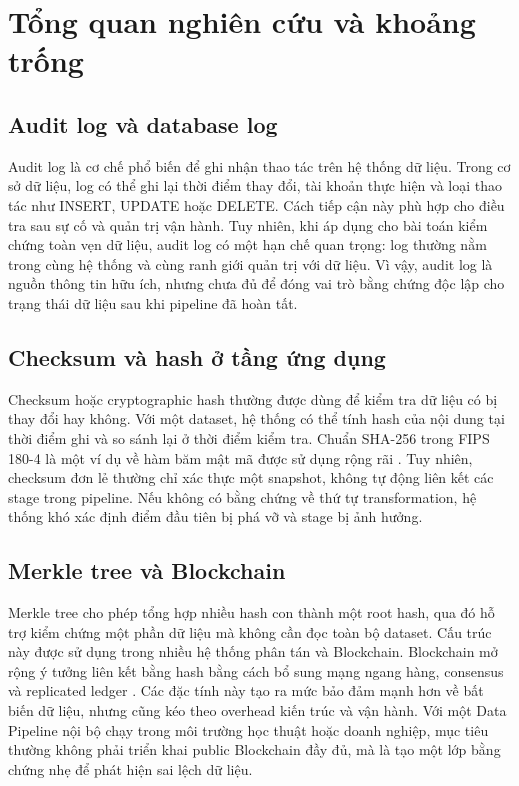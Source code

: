 \section{Tổng quan nghiên cứu và khoảng trống}

\subsection{Audit log và database log}

Audit log là cơ chế phổ biến để ghi nhận thao tác trên hệ thống dữ liệu. Trong cơ sở dữ liệu, log có thể ghi lại thời điểm thay đổi, tài khoản thực hiện và loại thao tác như INSERT, UPDATE hoặc DELETE. Cách tiếp cận này phù hợp cho điều tra sau sự cố và quản trị vận hành. Tuy nhiên, khi áp dụng cho bài toán kiểm chứng toàn vẹn dữ liệu, audit log có một hạn chế quan trọng: log thường nằm trong cùng hệ thống và cùng ranh giới quản trị với dữ liệu. Vì vậy, audit log là nguồn thông tin hữu ích, nhưng chưa đủ để đóng vai trò bằng chứng độc lập cho trạng thái dữ liệu sau khi pipeline đã hoàn tất.

\subsection{Checksum và hash ở tầng ứng dụng}

Checksum hoặc cryptographic hash thường được dùng để kiểm tra dữ liệu có bị thay đổi hay không. Với một dataset, hệ thống có thể tính hash của nội dung tại thời điểm ghi và so sánh lại ở thời điểm kiểm tra. Chuẩn SHA-256 trong FIPS 180-4 là một ví dụ về hàm băm mật mã được sử dụng rộng rãi \cite{nist1804}. Tuy nhiên, checksum đơn lẻ thường chỉ xác thực một snapshot, không tự động liên kết các stage trong pipeline. Nếu không có bằng chứng về thứ tự transformation, hệ thống khó xác định điểm đầu tiên bị phá vỡ và stage bị ảnh hưởng.

\subsection{Merkle tree và Blockchain}

Merkle tree cho phép tổng hợp nhiều hash con thành một root hash, qua đó hỗ trợ kiểm chứng một phần dữ liệu mà không cần đọc toàn bộ dataset. Cấu trúc này được sử dụng trong nhiều hệ thống phân tán và Blockchain. Blockchain mở rộng ý tưởng liên kết bằng hash bằng cách bổ sung mạng ngang hàng, consensus và replicated ledger \cite{nakamoto2008bitcoin}. Các đặc tính này tạo ra mức bảo đảm mạnh hơn về bất biến dữ liệu, nhưng cũng kéo theo overhead kiến trúc và vận hành. Với một Data Pipeline nội bộ chạy trong môi trường học thuật hoặc doanh nghiệp, mục tiêu thường không phải triển khai public Blockchain đầy đủ, mà là tạo một lớp bằng chứng nhẹ để phát hiện sai lệch dữ liệu.

